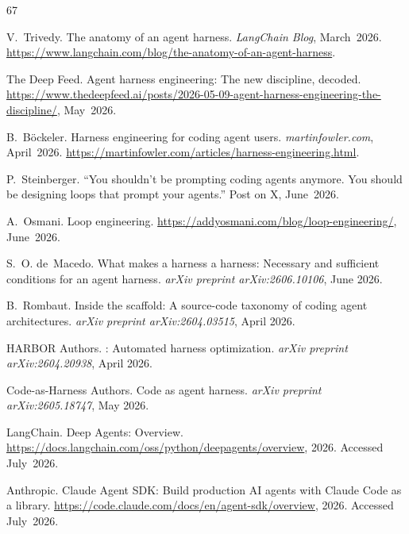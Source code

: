 \documentclass[11pt,a4paper]{article}
\begin{document}
\begin{thebibliography}{67}

V.~Trivedy.
\newblock The anatomy of an agent harness.
\newblock \emph{LangChain Blog}, March~2026.
\newblock \url{https://www.langchain.com/blog/the-anatomy-of-an-agent-harness}.

{The Deep Feed}.
\newblock Agent harness engineering: The new discipline, decoded.
\newblock \url{https://www.thedeepfeed.ai/posts/2026-05-09-agent-harness-engineering-the-discipline/}, May~2026.

B.~B{\"o}ckeler.
\newblock Harness engineering for coding agent users.
\newblock \emph{martinfowler.com}, April~2026.
\newblock \url{https://martinfowler.com/articles/harness-engineering.html}.

P.~Steinberger.
\newblock ``You shouldn't be prompting coding agents anymore. You should be designing loops that prompt your agents.''
\newblock Post on X, June~2026.

A.~Osmani.
\newblock Loop engineering.
\newblock \url{https://addyosmani.com/blog/loop-engineering/}, June~2026.

S.~O. de~Macedo.
\newblock What makes a harness a harness: Necessary and sufficient conditions for an agent harness.
\newblock \emph{arXiv preprint arXiv:2606.10106}, June 2026.

B.~Rombaut.
\newblock Inside the scaffold: A source-code taxonomy of coding agent architectures.
\newblock \emph{arXiv preprint arXiv:2604.03515}, April 2026.

{HARBOR Authors}.
: Automated harness optimization.
\newblock \emph{arXiv preprint arXiv:2604.20938}, April 2026.

{Code-as-Harness Authors}.
\newblock Code as agent harness.
\newblock \emph{arXiv preprint arXiv:2605.18747}, May 2026.

{LangChain}.
\newblock Deep Agents: Overview.
\newblock \url{https://docs.langchain.com/oss/python/deepagents/overview}, 2026.
\newblock Accessed July~2026.

{Anthropic}.
\newblock Claude Agent {SDK}: Build production {AI} agents with {Claude Code} as a library.
\newblock \url{https://code.claude.com/docs/en/agent-sdk/overview}, 2026.
\newblock Accessed July~2026.


\end{thebibliography}
\end{document}
